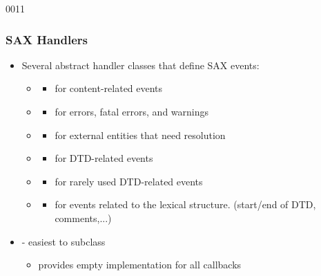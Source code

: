 \begin{slide}{0011}\frametitle{SAX Handlers}
\begin{itemize}
  \item Several abstract handler classes that define SAX events:
    \begin{itemize}
    \item \textbf{}
      \begin{itemize}
      \item for content-related events
      \end{itemize}
    \item \textbf{}
      \begin{itemize}
      \item for errors, fatal errors, and warnings
      \end{itemize}

    \item \textbf{}
      \begin{itemize}
      \item for external entities that need resolution
      \end{itemize}
    \item \textbf{}
      \begin{itemize}
      \item for DTD-related events
      \end{itemize}
    \item \textbf{}
      \begin{itemize}
      \item for rarely used DTD-related events
      \end{itemize}
    \item  \textbf{}
      \begin{itemize}
      \item for events related to the lexical structure. (start/end of DTD, comments,...)
      \end{itemize}
    \end{itemize}
  \item \textbf{} - easiest to subclass 
    \begin{itemize}
    \item provides empty implementation for all callbacks
    \end{itemize}

  \end{itemize}
\end{slide}
